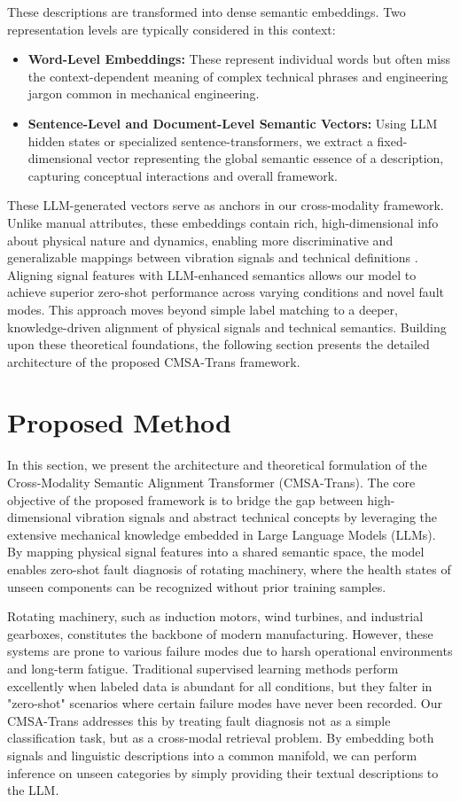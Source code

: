 \documentclass[journal]{IEEEtran}
\begin{document}
These descriptions are transformed into dense semantic embeddings. Two representation levels are typically considered in this context:
\begin{itemize}
    \item \textbf{Word-Level Embeddings:} These represent individual words but often miss the context-dependent meaning of complex technical phrases and engineering jargon common in mechanical engineering.
    \item \textbf{Sentence-Level and Document-Level Semantic Vectors:} Using LLM hidden states or specialized sentence-transformers, we extract a fixed-dimensional vector representing the global semantic essence of a description, capturing conceptual interactions and overall framework.
\end{itemize}
These LLM-generated vectors serve as anchors in our cross-modality framework. Unlike manual attributes, these embeddings contain rich, high-dimensional info about physical nature and dynamics, enabling more discriminative and generalizable mappings between vibration signals and technical definitions \cite{brown2020language, devlin2018bert, industrial_llm_ref}. Aligning signal features with LLM-enhanced semantics allows our model to achieve superior zero-shot performance across varying conditions and novel fault modes. This approach moves beyond simple label matching to a deeper, knowledge-driven alignment of physical signals and technical semantics. Building upon these theoretical foundations, the following section presents the detailed architecture of the proposed CMSA-Trans framework.

\section{Proposed Method}
In this section, we present the architecture and theoretical formulation of the Cross-Modality Semantic Alignment Transformer (CMSA-Trans). The core objective of the proposed framework is to bridge the gap between high-dimensional vibration signals and abstract technical concepts by leveraging the extensive mechanical knowledge embedded in Large Language Models (LLMs). By mapping physical signal features into a shared semantic space, the model enables zero-shot fault diagnosis of rotating machinery, where the health states of unseen components can be recognized without prior training samples.

Rotating machinery, such as induction motors, wind turbines, and industrial gearboxes, constitutes the backbone of modern manufacturing. However, these systems are prone to various failure modes due to harsh operational environments and long-term fatigue. Traditional supervised learning methods perform excellently when labeled data is abundant for all conditions, but they falter in "zero-shot" scenarios where certain failure modes have never been recorded. Our CMSA-Trans addresses this by treating fault diagnosis not as a simple classification task, but as a cross-modal retrieval problem. By embedding both signals and linguistic descriptions into a common manifold, we can perform inference on unseen categories by simply providing their textual descriptions to the LLM.
\end{document}
